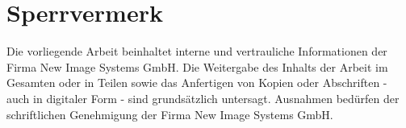 \chapter*{Sperrvermerk}
Die vorliegende Arbeit beinhaltet interne und vertrauliche Informationen der Firma New Image Systems GmbH. Die Weitergabe des Inhalts der Arbeit im Gesamten oder in Teilen sowie das Anfertigen von Kopien oder Abschriften - auch in digitaler Form - sind grundsätzlich untersagt. Ausnahmen bedürfen der schriftlichen Genehmigung der Firma New Image Systems GmbH.